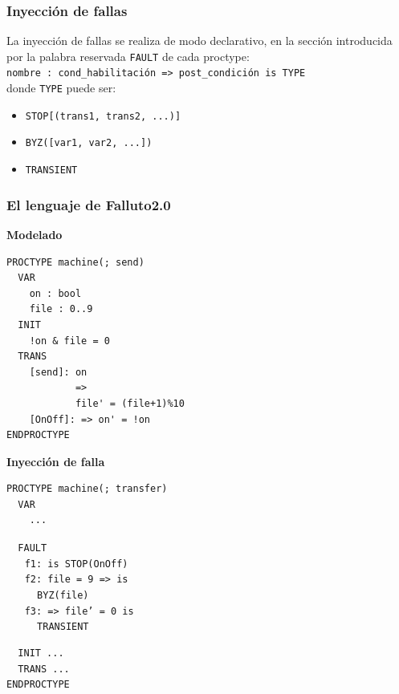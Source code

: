 \documentclass[serif]{beamer}
\begin{document}
\begin{frame}
\frametitle{Inyección de fallas}
La inyección de fallas se realiza de modo declarativo, en la 
sección introducida por la palabra reservada \texttt{FAULT} de 
cada proctype:\\[0.5cm]
\texttt{nombre : cond\_habilitaci\'on => post\_condición is TYPE} \\[0.5cm]
donde \texttt{TYPE} puede ser: \\[0.5cm]
\begin{itemize}
\item \texttt{STOP[(trans1, trans2, ...)]}
\item \texttt{BYZ([var1, var2, ...])}
\item \texttt{TRANSIENT}
\end{itemize}
\end{frame}


\begin{frame}[fragile]
\frametitle{El lenguaje de Falluto2.0}
{\fontsize{7pt}{10pt}\selectfont
\begin{minipage}{0.45\textwidth}
{\large \bfseries Modelado}
\begin{framed} 
\begin{verbatim}
PROCTYPE machine(; send)
  VAR
    on : bool
    file : 0..9
  INIT
    !on & file = 0
  TRANS
    [send]: on 
            => 
            file' = (file+1)%10
    [OnOff]: => on' = !on
ENDPROCTYPE
\end{verbatim}
\end{framed}
\end{minipage}
\hspace{0.04\textwidth}
\begin{minipage}{0.45\textwidth}
{\large \bfseries Inyección de falla}
\begin{framed}
\begin{verbatim}
PROCTYPE machine(; transfer)
  VAR
    ...
\end{verbatim}
\texttt{\color{red}~~FAULT\\$~~~~~$
f1: is STOP(OnOff)\\$~~~~~$
f2: file = 9 => is\\$~~~~~~~~~~$ BYZ(file)\\$~~~~~$
f3: => file' = 0 is\\$~~~~~~~~~~$ TRANSIENT}
\begin{verbatim}
  INIT ...
  TRANS ...
ENDPROCTYPE
\end{verbatim}
\end{framed}
\end{minipage}
} %

\end{frame}
\end{document}
